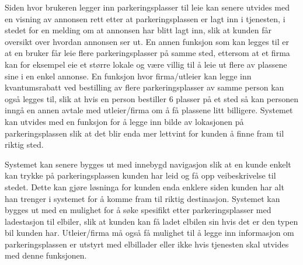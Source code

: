 Siden hvor brukeren legger inn parkeringsplasser til leie kan senere utvides med en visning av annonsen rett etter at parkeringsplassen er lagt inn i tjenesten, i stedet for en melding om at annonsen har blitt lagt inn, slik at kunden får oversikt over hvordan annonsen ser ut. En annen funksjon som kan legges til er at en bruker får leie flere parkeringsplasser på samme sted, ettersom at et firma kan for eksempel eie et større lokale og være villig til å leie ut flere av plassene sine i en enkel annonse. En funksjon hvor firma/utleier kan legge inn kvantumsrabatt ved bestilling av flere parkeringsplasser av samme person kan også legges til, slik at hvis en person bestiller 6 plasser på et sted så kan personen inngå en annen avtale med utleier/firma om å få plassene litt billigere. Systemet kan utvides med en funksjon for å legge inn bilde av lokasjonen på parkeringsplassen slik at det blir enda mer lettvint for kunden å finne fram til riktig sted.  

 

Systemet kan senere bygges ut med innebygd navigasjon slik at en kunde enkelt kan trykke på parkeringsplassen kunden har leid og få opp veibeskrivelse til stedet. Dette kan gjøre løsninga for kunden enda enklere siden kunden har alt han trenger i systemet for å komme fram til riktig destinasjon. Systemet kan bygges ut med en mulighet for å søke spesifikt etter parkeringsplasser med ladestasjon til elbiler, slik at kunden kan få ladet elbilen sin hvis det er den typen bil kunden har. Utleier/firma må også få mulighet til å legge inn informasjon om parkeringsplassen er utstyrt med elbillader eller ikke hvis tjenesten skal utvides med denne funksjonen.  





